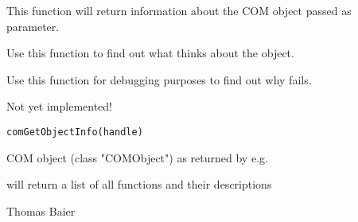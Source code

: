 \begin{Description}\relax
This function will return information about the COM object passed as
parameter.

Use this function to find out what  thinks about the object.

Use this function for debugging purposes to find out why  fails.

Not yet implemented!
\end{Description}
\begin{Usage}
\begin{verbatim}
comGetObjectInfo(handle)
\end{verbatim}
\end{Usage}
\begin{Arguments}
\begin{ldescription}
\item[\code{handle}] COM object (class "COMObject") as returned by e.g.
\end{ldescription}
\end{Arguments}
\begin{Value}
 will return a list of all functions and their descriptions
\end{Value}
\begin{Author}\relax
Thomas Baier
\end{Author}

